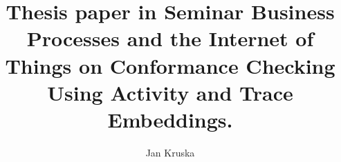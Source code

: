\documentclass[runningheads]{llncs}
\begin{document}
%
\title{Thesis paper in Seminar Business Processes and the Internet of Things on Conformance Checking Using Activity and Trace Embeddings.}
%
%
\author{Jan Kruska}
%
%
%
\maketitle              %
%
\begin{abstract}
\end{abstract}
%
%
%
\end{document}
